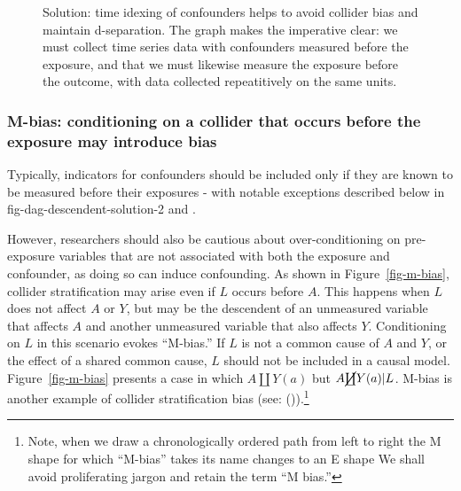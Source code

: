 \documentclass[
  singlecolumn,
  9pt]{article}
\begin{document}
\begin{figure}


\caption{\label{fig-dag-common-effect-solution}Solution: time idexing of
confounders helps to avoid collider bias and maintain d-separation. The
graph makes the imperative clear: we must collect time series data with
confounders measured before the exposure, and that we must likewise
measure the exposure before the outcome, with data collected
repeatitively on the same units.}

\end{figure}%

\subsubsection{M-bias: conditioning on a collider that occurs before the
exposure may introduce
bias}\label{m-bias-conditioning-on-a-collider-that-occurs-before-the-exposure-may-introduce-bias}

Typically, indicators for confounders should be included only if they
are known to be measured before their exposures - with notable
exceptions described below in fig-dag-descendent-solution-2 and .

However, researchers should also be cautious about over-conditioning on
pre-exposure variables that are not associated with both the exposure
and confounder, as doing so can induce confounding. As shown in
Figure~\ref{fig-m-bias}, collider stratification may arise even if \(L\)
occurs before \(A\). This happens when \(L\) does not affect \(A\) or
\(Y\), but may be the descendent of an unmeasured variable that affects
\(A\) and another unmeasured variable that also affects \(Y\).
Conditioning on \(L\) in this scenario evokes ``M-bias.'' If \(L\) is
not a common cause of \(A\) and \(Y\), or the effect of a shared common
cause, \(L\) should not be included in a causal model.
Figure~\ref{fig-m-bias} presents a case in which \(A \coprod Y(a)\) but
\(A \cancel{\coprod} Y(a)| L\). M-bias is another example of collider
stratification bias (see: ()).\footnote{Note, when we draw a chronologically ordered path from
  left to right the M shape for which ``M-bias'' takes its name changes
  to an E shape We shall avoid proliferating jargon and retain the term
  ``M bias.''}
\end{document}
